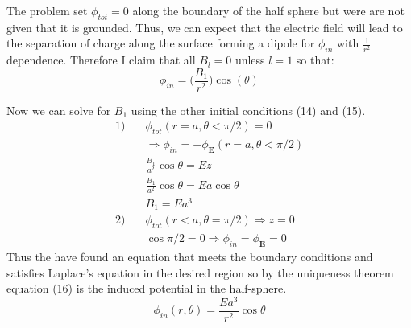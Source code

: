 \documentclass[a4paper, 11pt]{article}
\begin{document}
The problem set $\phi_{tot} = 0$ along the boundary of the half sphere but were are not given that it is grounded. Thus, we can expect that the electric field will lead to the separation of charge along the surface forming a dipole for $\phi_{in}$ with $\frac{1}{r^2}$ dependence. Therefore I claim that all $B_l = 0$ unless $l = 1$ so that: 
\begin{equation*}
	\phi_{in} = \bigg( \frac{B_1}{r^2} \bigg)\cos(\theta)
\end{equation*}

Now we can solve for $B_1$ using the other initial conditions (14) and (15).
\begin{align*}
	1) \quad &\phi_{tot}(r=a, \theta < \pi/2) = 0\\ 
	&\Rightarrow \phi_{in} = -\phi_{\mathbf{E}}(r=a, \theta < \pi/2)\\
	&\frac{B_1}{a^2}\cos{\theta} = Ez \\ 
	&\frac{B_1}{a^2}\cos{\theta} = Ea\cos{\theta}\\ 
	&B_1 = Ea^3 \\ 
	2) \quad &\phi_{tot}(r < a, \theta = \pi/2) \Rightarrow z = 0\\ 
	& \cos{\pi/2} = 0 \Rightarrow \phi_{in} = \phi_{\mathbf{E}} = 0
\end{align*}
Thus the have found an equation that meets the boundary conditions and satisfies Laplace's equation in the desired region so by the uniqueness theorem equation (16) is the induced potential in the half-sphere. 
\begin{equation}
	\phi_{in}(r,\theta) = \frac{Ea^3}{r^2}\cos{\theta}
\end{equation}
\end{document}
